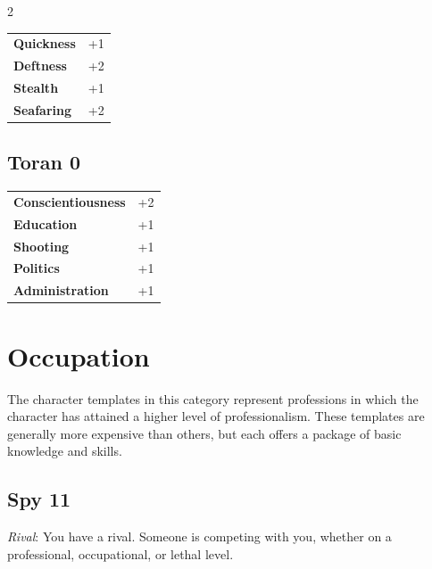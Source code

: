 \begin{multicols}{2}
\begin{tcolorbox}
\begin{tabular}{@{}ll@{}}
    \textbf{Quickness} & +1\\
    \textbf{Deftness} & +2\\
    \textbf{Stealth} & +1\\
    \textbf{Seafaring} & +2\\
\end{tabular}


\end{tcolorbox}

\begin{tcolorbox}
    \subsection*{Toran \hfill \small{0 }}
    \tcblower




\begin{tabular}{@{}ll@{}}
    \textbf{Conscientiousness} & +2\\
    \textbf{Education} & +1\\
    \textbf{Shooting} & +1\\
    \textbf{Politics} & +1\\
    \textbf{Administration} & +1\\
\end{tabular}


\end{tcolorbox}

\section{Occupation}

The character templates in this category represent professions in which the character has attained a higher level of professionalism. These templates are generally more expensive than others, but each offers a package of basic knowledge and skills.

\begin{tcolorbox}
    \subsection*{Spy \hfill \small{11 }}
    \tcblower
\textit{Rival}: You have a rival. Someone is competing with you, whether on a professional, occupational, or lethal level.



\end{tcolorbox}
\end{multicols}
